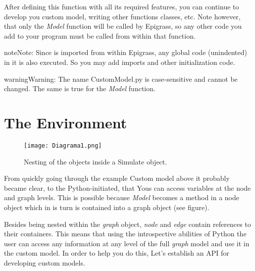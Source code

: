 \documentclass[a4paper,10pt,english]{sphinxmanual}
\begin{document}
After defining this function with all its required features, you can continue to develop you custom model, writing other functions classes, etc. Note however, that only the \emph{Model} function will be called by Epigrass, so any other code you add to your program must be called from within that function.

\begin{notice}{note}{Note:}
Since  is imported from within Epigrass, any global code (unindented) in it is also  executed. So you may add imports and other initialization code.
\end{notice}

\begin{notice}{warning}{Warning:}
The name CustomModel.py is case-sensitive and cannot be changed. The same is true for the \emph{Model} function.
\end{notice}


\section{The Environment}
\label{scripting:the-environment}\begin{figure}[htbp]
\centering
\capstart

\texttt{[image: Diagrama1.png]}
\caption{Nesting of the objects inside a Simulate object.}\end{figure}

From quickly going through the example Custom model above it probably became clear, to the Python-initiated, that Yous can access variables at the node and graph levels.  This is possible because \emph{Model} becomes a method in a node object which in is turn is contained into a graph object (see figure).

Besides being nested within the \emph{graph} object, \emph{node} and \emph{edge} contain references to their containers. This means that using the introspective abilities of Python the user can access any information at any level of the full \emph{graph} model and use it in the custom model. In order to help you do this, Let's establish an API for developing custom models.
\end{document}
